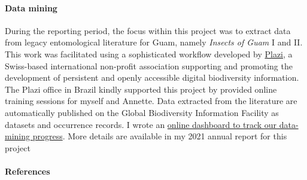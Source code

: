 \begin{refsection}
	\paragraph{Data mining} During the reporting period, the focus within this project was to extract data from legacy entomological literature for Guam, namely \textit{Insects of Guam} I and II. This work was facilitated using a sophisticated workflow developed by \href{https://en.wikipedia.org/wiki/Plazi}{Plazi}, a Swiss-based international non-profit association supporting and promoting the development of persistent and openly accessible digital biodiversity information. The Plazi office in Brazil kindly supported this project by provided online training sessions for myself and Annette. Data extracted from the literature are automatically published on the Global Biodiversity Information Facility as datasets and occurrence records. I wrote an \href{https://aubreymoore.github.io/data-mining-insects-of-guam/validator2/status_report.html}{online dashboard to track our data-mining progress}. More details are available in my 2021 annual report for this project \cite{moore_guam_2021}

	\paragraph{References}
	\printbibliography[heading=none]
\end{refsection}

